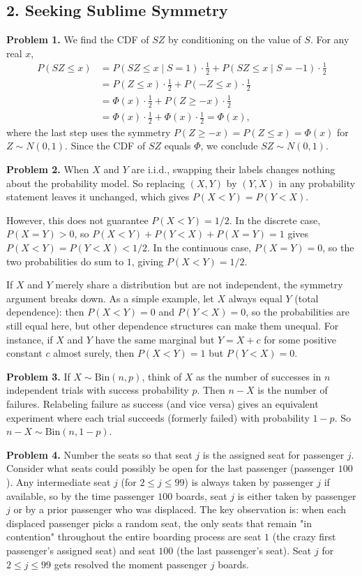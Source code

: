 \documentclass{article}
\begin{document}
\subsection*{2. Seeking Sublime Symmetry}

\textbf{Problem 1.} We find the CDF of $SZ$ by conditioning on the value of $S$. For any real $x$,
\begin{align*}
P(SZ \le x) &= P(SZ \le x \mid S=1)\cdot\tfrac12 + P(SZ \le x \mid S=-1)\cdot\tfrac12 \\
&= P(Z \le x)\cdot\tfrac12 + P(-Z \le x)\cdot\tfrac12 \\
&= \Phi(x)\cdot\tfrac12 + P(Z \ge -x)\cdot\tfrac12 \\
&= \Phi(x)\cdot\tfrac12 + \Phi(x)\cdot\tfrac12 = \Phi(x),
\end{align*}
where the last step uses the symmetry $P(Z \ge -x) = P(Z \le x) = \Phi(x)$ for $Z\sim N(0,1)$. Since the CDF of $SZ$ equals $\Phi$, we conclude $SZ\sim N(0,1)$.

\bigskip
\textbf{Problem 2.} When $X$ and $Y$ are i.i.d., swapping their labels changes nothing about the probability model. So replacing $(X,Y)$ by $(Y,X)$ in any probability statement leaves it unchanged, which gives $P(X<Y)=P(Y<X)$.

However, this does not guarantee $P(X<Y)=1/2$. In the discrete case, $P(X=Y)>0$, so $P(X<Y)+P(Y<X)+P(X=Y)=1$ gives $P(X<Y)=P(Y<X)<1/2$. In the continuous case, $P(X=Y)=0$, so the two probabilities do sum to $1$, giving $P(X<Y)=1/2$.

If $X$ and $Y$ merely share a distribution but are not independent, the symmetry argument breaks down. As a simple example, let $X$ always equal $Y$ (total dependence): then $P(X<Y)=0$ and $P(Y<X)=0$, so the probabilities are still equal here, but other dependence structures can make them unequal. For instance, if $X$ and $Y$ have the same marginal but $Y=X+c$ for some positive constant $c$ almost surely, then $P(X<Y)=1$ but $P(Y<X)=0$.

\bigskip
\textbf{Problem 3.} If $X\sim\text{Bin}(n,p)$, think of $X$ as the number of successes in $n$ independent trials with success probability $p$. Then $n-X$ is the number of failures. Relabeling failure as success (and vice versa) gives an equivalent experiment where each trial succeeds (formerly failed) with probability $1-p$. So $n-X\sim\text{Bin}(n,1-p)$.

\bigskip
\textbf{Problem 4.} Number the seats so that seat $j$ is the assigned seat for passenger $j$. Consider what seats could possibly be open for the last passenger (passenger $100$). Any intermediate seat $j$ (for $2\le j\le 99$) is always taken by passenger $j$ if available, so by the time passenger $100$ boards, seat $j$ is either taken by passenger $j$ or by a prior passenger who was displaced. The key observation is: when each displaced passenger picks a random seat, the only seats that remain "in contention" throughout the entire boarding process are seat $1$ (the crazy first passenger's assigned seat) and seat $100$ (the last passenger's seat). Seat $j$ for $2\le j\le99$ gets resolved the moment passenger $j$ boards.
\end{document}
